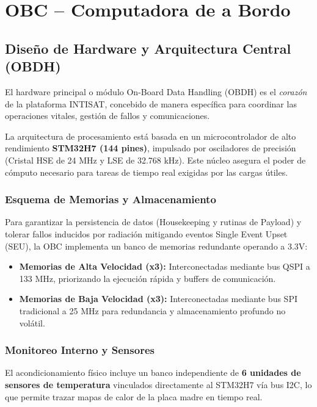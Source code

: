 \chapter{OBC – Computadora de a Bordo}

\section{Diseño de Hardware y Arquitectura Central (OBDH)}
El hardware principal o módulo On-Board Data Handling (OBDH) es el \textit{corazón} de la plataforma INTISAT, concebido de manera específica para coordinar las operaciones vitales, gestión de fallos y comunicaciones.

La arquitectura de procesamiento está basada en un microcontrolador de alto rendimiento \textbf{STM32H7 (144 pines)}, impulsado por osciladores de precisión (Cristal HSE de 24 MHz y LSE de 32.768 kHz). Este núcleo asegura el poder de cómputo necesario para tareas de tiempo real exigidas por las cargas útiles.


\subsection{Esquema de Memorias y Almacenamiento}
Para garantizar la persistencia de datos (Housekeeping y rutinas de Payload) y tolerar fallos inducidos por radiación mitigando eventos Single Event Upset (SEU), la OBC implementa un banco de memorias redundante operando a 3.3V:
\begin{itemize}
    \item \textbf{Memorias de Alta Velocidad (x3):} Interconectadas mediante bus QSPI a 133 MHz, priorizando la ejecución rápida y buffers de comunicación.
    \item \textbf{Memorias de Baja Velocidad (x3):} Interconectadas mediante bus SPI tradicional a 25 MHz para redundancia y almacenamiento profundo no volátil.
\end{itemize}

\subsection{Monitoreo Interno y Sensores}
El acondicionamiento físico incluye un banco independiente de \textbf{6 unidades de sensores de temperatura} vinculados directamente al STM32H7 vía bus I2C, lo que permite trazar mapas de calor de la placa madre en tiempo real. 

